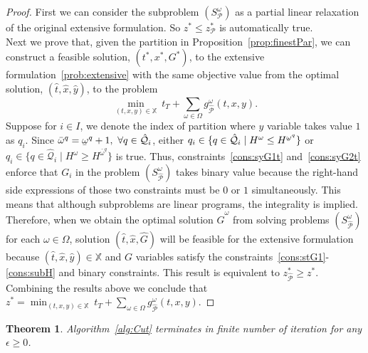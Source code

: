 \documentclass[11pt]{article}
\newtheorem{theorem}{Theorem}
\renewcommand{\underbar}{\underaccent{\bar}}
\begin{document}
	\begin{proof}
		First we can consider the subproblem \((S_\mathcal{P}^\omega)\) as a partial linear relaxation of the original extensive formulation. So \(z^* \leq z^*_\mathcal{P}\) is automatically true.\\
		\newline
		Next we prove that, given the partition in Proposition~\ref{prop:finestPar}, we can construct a feasible solution, \((t^*,x^*,G^*)\), to the extensive formulation~\eqref{prob:extensive} with the same objective value from the optimal solution, \((\hat{t},\hat{x},\hat{y})\), to the problem
		\[\min_{(t,x,y) \in \mathbb{X}}\ t_T + \sum_{\omega \in \Omega} g^\omega_{\hat{\mathcal{P}}}(t,x,y).\]
		Suppose for \(i \in I\), we denote the index of partition where \(y\) variable takes value \(1\) as \(q_i\). Since \(\bar{\omega}^q = \underbar{\omega}^q + 1,\ \forall q \in \hat{\mathcal{Q}}_i\), either \(q_i \in \{q \in \hat{\mathcal{Q}}_i \mid H^\omega \leq H^{\underbar{\omega}^q}\}\) or \(q_i \in \{q \in \hat{\mathcal{Q}}_i \mid H^\omega \geq H^{\bar{\omega}^q}\}\) is true. Thus, constraints~\eqref{cons:syG1t} and~\eqref{cons:syG2t} enforce that \(G_i\) in the problem \((S_{\hat{\mathcal{P}}}^\omega)\) takes binary value because the right-hand side expressions of those two constraints must be \(0\) or \(1\) simultaneously. This means that although subproblems are linear programs, the integrality is implied. Therefore, when we obtain the optimal solution \(\hat{G}^\omega\) from solving problems \((S_{\hat{\mathcal{P}}}^\omega)\) for each \(\omega \in \Omega\), solution \((\hat{t},\hat{x},\hat{G})\) will be feasible for the extensive formulation because \((\hat{t},\hat{x},\hat{y}) \in \mathbb{X}\) and \(G\) variables satisfy the constraints~\eqref{cons:stG1}-\eqref{cons:subH} and binary constraints. This result is equivalent to \(z_{\hat{\mathcal{P}}}^* \geq z^*\). Combining the results above we conclude that \(z^* = \min_{(t,x,y) \in \mathbb{X}}\ t_T + \sum_{\omega \in \Omega} g^\omega_{\hat{\mathcal{P}}}(t,x,y).\)
	\end{proof}
	\begin{theorem} \label{thm:converge}
		Algorithm~\ref{alg:Cut} terminates in finite number of iteration for any \(\epsilon \geq 0\). 
	\end{theorem}
\end{document}
